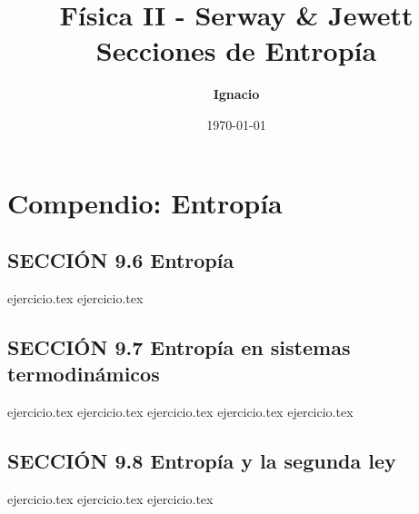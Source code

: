 \documentclass[11pt,spanish,oneside]{article}
\title{\textbf{Física II - Serway \& Jewett} \\ \Large Secciones de Entropía}
\author{\textbf{Ignacio}}
\date{\today}
\begin{document}
\maketitle

\section*{Compendio: Entropía}

\subsection*{SECCIÓN 9.6 Entropía}
\begin{enumerate}
    \setcounter{enumi}{19}
    {ejercicio.tex}
    {ejercicio.tex}
\end{enumerate}

\subsection*{SECCIÓN 9.7 Entropía en sistemas termodinámicos}
\begin{enumerate}
    \setcounter{enumi}{21}
    {ejercicio.tex}
    {ejercicio.tex}
    {ejercicio.tex}
    {ejercicio.tex}
    {ejercicio.tex}
\end{enumerate}

\subsection*{SECCIÓN 9.8 Entropía y la segunda ley}
\begin{enumerate}
    \setcounter{enumi}{26}
    {ejercicio.tex}
    {ejercicio.tex}
    {ejercicio.tex}
\end{enumerate}
\end{document}
